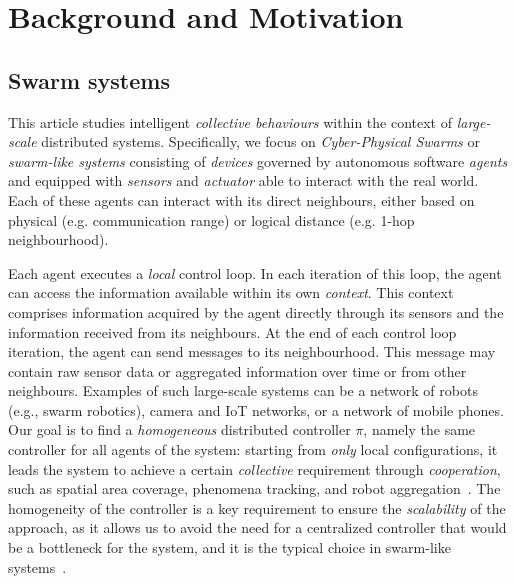 \section{Background and Motivation}
\label{sec:background}
\subsection{Swarm systems}
This article studies intelligent \emph{collective behaviours} within the context of \emph{large-scale} distributed systems.
 Specifically, we focus on \emph{Cyber-Physical Swarms} or \emph{swarm-like systems} consisting of \emph{devices} governed by autonomous software \emph{agents} and equipped with \emph{sensors} and \emph{actuator} able to interact with the real world.
 Each of these agents can interact with its direct neighbours, either based on physical (e.g. communication range) or logical distance (e.g. 1-hop neighbourhood).
 
%
Each agent
 executes a \emph{local} control loop. 
 In each iteration of this loop, the agent can access the information available within its own \emph{context}. 
 This context comprises information acquired by the agent directly through its sensors and the information received from its neighbours. 
%
At the end of each control loop iteration, 
 the agent can send messages to its neighbourhood. 
 This message may contain raw sensor data or aggregated information over time or from other neighbours.
%
Examples of such large-scale systems can be a network of robots (e.g., swarm robotics), camera and IoT networks, or a network of mobile phones.
%
Our goal is to find a \emph{homogeneous} distributed controller $\pi$, namely the same controller for all agents of the system:
 starting from \emph{only} local configurations, it leads 
 the system to achieve a certain \emph{collective} requirement through \emph{cooperation}, 
 such as spatial area coverage, phenomena tracking, and robot aggregation~\cite{DBLP:journals/firai/SchranzUSE20}.
%
The homogeneity of the controller is a key requirement to ensure the \emph{scalability} of the approach, 
 as it allows us to avoid the need for a centralized controller that would be a bottleneck for the system,
 and it is the typical choice in swarm-like systems~\cite{brambilla2013swarm,yang2021many,pmlr-v80-yang18d,DBLP:conf/aaai/ZhengYCZZWY18}.
%

